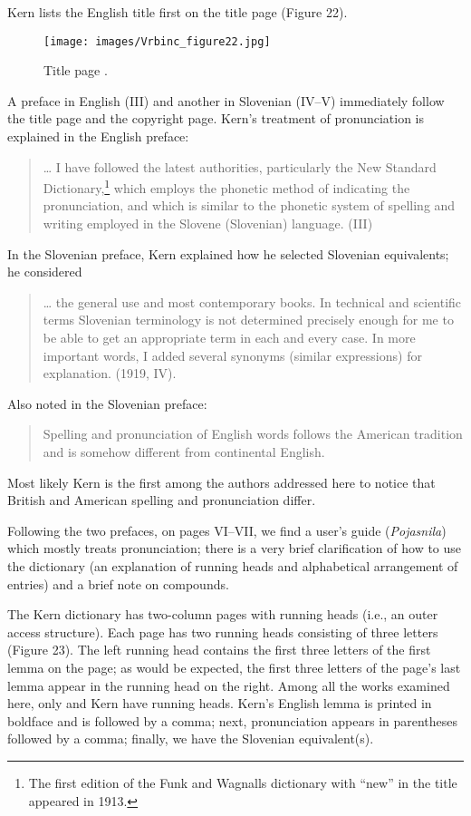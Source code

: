 \documentclass[output=paper,colorlinks,citecolor=brown,arabicfont,chinesefont]{langscibook}
\begin{document}
Kern lists the English title first on the title page (Figure 22). 

\begin{figure}
\texttt{[image: images/Vrbinc\_figure22.jpg]}
\caption{Title page \citep{Kern1919}.}
\label{Figure 22}
\end{figure}

A preface in English (III) and another in Slovenian (IV–V) immediately follow the title page and the copyright page. Kern’s treatment of pronunciation is explained in the English preface:

\begin{quote}
    … I have followed the latest authorities, particularly the New Standard Dictionary,\footnote{The first edition of the Funk and Wagnalls dictionary with “new” in the title appeared in 1913.} which employs the phonetic method of indicating the pronunciation, and which is similar to the phonetic system of spelling and writing employed in the Slovene (Slovenian) language. (III)
\end{quote}

In the Slovenian preface, Kern explained how he selected Slovenian equivalents; he considered 

\begin{quote}
    … the general use and most contemporary books. In technical and scientific terms Slovenian terminology is not determined precisely enough for me to be able to get an appropriate term in each and every case. In more important words, I added several synonyms (similar expressions) for explanation. (1919, IV).
\end{quote}

Also noted in the Slovenian preface: 

\begin{quote}
    Spelling and pronunciation of English words follows the American tradition and is somehow different from continental English. 
\end{quote}

Most likely Kern is the first among the authors addressed here to notice that British and American spelling and pronunciation differ.

Following the two prefaces, on pages VI–VII, we find a user’s guide (\emph{Pojasnila}) which mostly treats pronunciation; there is a very brief clarification of how to use the dictionary (an explanation of running heads and alphabetical arrangement of entries) and a brief note on compounds. 

The Kern dictionary has two-column pages with running heads (i.e., an outer access structure). Each page has two running heads consisting of three letters (Figure 23). The left running head contains the first three letters of the first lemma on the page; as would be expected, the first three letters of the page’s last lemma appear in the running head on the right. Among all the works examined here, only \citet{Kubelka1904} and Kern have running heads. Kern’s English lemma is printed in boldface and is followed by a comma; next, pronunciation appears in parentheses followed by a comma; finally, we have the Slovenian equivalent(s).
\end{document}
